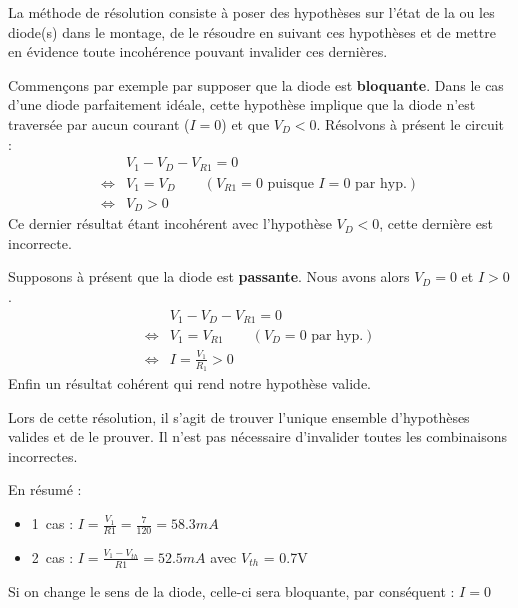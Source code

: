 \documentclass{../template/tp}
\begin{document}
{%
La méthode de résolution consiste à poser des hypothèses sur l'état de la ou les diode(s) dans le montage, de le résoudre en suivant ces hypothèses et de mettre en évidence toute incohérence pouvant invalider ces dernières.

Commençons par exemple par supposer que la diode est \textbf{bloquante}.
Dans le cas d'une diode parfaitement idéale, cette hypothèse implique que la diode n'est traversée par aucun courant ($I = 0$) et que $V_D < 0$.
Résolvons à présent le circuit :
\begin{align*}
    &V_1 - V_D - V_{R1} = 0 \\
    \Leftrightarrow &V_1 = V_D \quad\quad  (V_{R1} = 0 \mbox{ puisque }I = 0 \mbox{ par hyp.}) \\
    \Leftrightarrow &V_D > 0
\end{align*}
Ce dernier résultat étant incohérent avec l'hypothèse $V_D < 0$, cette dernière est incorrecte.

Supposons à présent que la diode est \textbf{passante}.
Nous avons alors $V_D = 0$ et $I > 0$.
\begin{align*}
    &V_1 - V_D - V_{R1} = 0 \\
    \Leftrightarrow &V_1 = V_{R1} \quad\quad  (V_D = 0 \mbox{ par hyp.}) \\
    \Leftrightarrow &I = \frac{V_1}{R_1} > 0
\end{align*}
Enfin un résultat cohérent qui rend notre hypothèse valide.

Lors de cette résolution, il s'agit de trouver l'unique ensemble d'hypothèses valides et de le prouver. Il n'est pas nécessaire d'invalider toutes les combinaisons incorrectes.

En résumé :
\begin{itemize}
    \item 1\ier~cas : $I = \frac{V_1}{R1} = \frac{7}{120} = 58.3mA$
    \item 2\ieme~cas : $I = \frac{V_1-V_{th}}{R1} = 52.5mA$ avec $V_{th}$ = 0.7V
\end{itemize}
Si on change le sens de la diode, celle-ci sera bloquante, par conséquent : $I=0$

}
\end{document}
